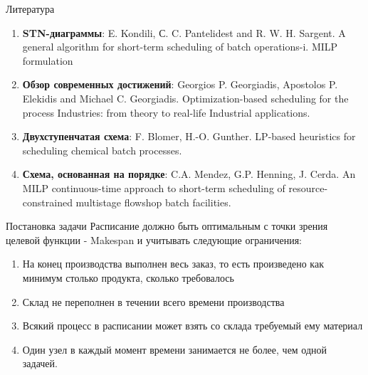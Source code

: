 \documentclass{beamer}
\begin{document}
\begin{frame}{Литература}
	\begin{enumerate}
	\item \textbf{STN-диаграммы}: E. Kondili, С. C. Pantelidest and R. W. H. Sargent. A general algorithm for short-term scheduling of batch operations-i. MILP formulation
	\item \textbf{Обзор современных достижений}: Georgios P. Georgiadis, Apostolos P. Elekidis and Michael C. Georgiadis. Optimization-based scheduling for the process Industries: from theory to real-life Industrial applications.
	\item \textbf{Двухступенчатая схема}: F. Blomer, H.-O. Gunther. LP-based heuristics for scheduling chemical batch processes.
	\item \textbf{Схема, основанная на порядке}: C.A. Mendez, G.P. Henning, J. Cerda. An MILP continuous-time approach to short-term scheduling of resource-constrained multistage flowshop batch facilities.
\end{enumerate}
\end{frame}

\begin{frame}{Постановка задачи}
	Расписание должно быть оптимальным с точки зрения целевой функции - Makespan и учитывать следующие ограничения:
	\begin{enumerate}
	\item На конец производства выполнен весь заказ, то есть произведено как минимум столько продукта, сколько требовалось
	\item Склад не переполнен в течении всего времени производства
	\item Всякий процесс в расписании может взять со склада требуемый ему материал
	\item Один узел в каждый момент времени занимается не более, чем одной задачей.
\end{enumerate}
\end{frame}
\end{document}
